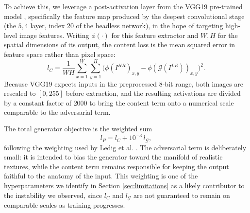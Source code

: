 \documentclass[conference]{IEEEtran}
\begin{document}
To achieve this, we leverage a post-activation layer from the VGG19 pre-trained model \cite{simonyan2014very}, specifically the feature map produced by the deepest convolutional stage (the $5{,}4$ layer, index 20 of the headless network), in the hope of targeting high-level image features. Writing $\phi(\cdot)$ for this feature extractor and $W, H$ for the spatial dimensions of its output, the content loss is the mean squared error in feature space rather than pixel space:
\begin{equation}
l_{C} = \frac{1}{W H} \sum_{x=1}^{W} \sum_{y=1}^{H} \Big(\phi(I^{HR})_{x,y} - \phi(\mathcal{G}(I^{LR}))_{x,y}\Big)^2 .
\label{eq:content}
\end{equation}
Because VGG19 expects inputs in the preprocessed 8-bit range, both images are rescaled to $[0,255]$ before extraction, and the resulting activations are divided by a constant factor of $2000$ to bring the content term onto a numerical scale comparable to the adversarial term.

The total generator objective is the weighted sum
\begin{equation}
l_{P} = l_{C} + 10^{-3} \, l_{\mathcal{G}},
\label{eq:perceptual}
\end{equation}
following the weighting used by Ledig et al. \cite{ledig2017photo}. The adversarial term is deliberately small: it is intended to bias the generator toward the manifold of realistic textures, while the content term remains responsible for keeping the output faithful to the anatomy of the input. This weighting is one of the hyperparameters we identify in Section \ref{sec:limitations} as a likely contributor to the instability we observed, since $l_C$ and $l_{\mathcal{G}}$ are not guaranteed to remain on comparable scales as training progresses.
\end{document}
